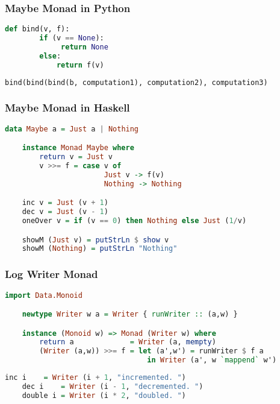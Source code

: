 \documentclass[presentation.tex]{subfiles}
\begin{document}
\begin{frame}[fragile]
  \frametitle{Maybe Monad in Python}
  \begin{lstlisting}[frame=single,language=Python,breaklines=true]
    def bind(v, f):
        if (v == None):
             return None
        else:			
            return f(v)
  \end{lstlisting}

  \begin{lstlisting}[frame=single,language=Python,breaklines=true]
    bind(bind(bind(b, computation1), computation2), computation3)
  \end{lstlisting}
\end{frame}


\begin{frame}[fragile]
  \frametitle{Maybe Monad in Haskell}
  \begin{lstlisting}[frame=single,language=Haskell,breaklines=true]
    data Maybe a = Just a | Nothing

    instance Monad Maybe where
        return v = Just v
        v >>= f = case v of
                       Just v -> f(v)
                       Nothing -> Nothing

    inc v = Just (v + 1)
    dec v = Just (v - 1)
    oneOver v = if (v == 0) then Nothing else Just (1/v)

    showM (Just v) = putStrLn $ show v
    showM (Nothing) = putStrLn "Nothing"
  \end{lstlisting}
\end{frame}

\begin{frame}[fragile]
  \frametitle{Log Writer Monad}
  \begin{lstlisting}[frame=single,language=Haskell,breaklines=true]
    import Data.Monoid

    newtype Writer w a = Writer { runWriter :: (a,w) }

    instance (Monoid w) => Monad (Writer w) where
        return a             = Writer (a, mempty)
        (Writer (a,w)) >>= f = let (a',w') = runWriter $ f a
                                 in Writer (a', w `mappend` w')
  \end{lstlisting}
  \pause
  \begin{lstlisting}[frame=single,language=Haskell,breaklines=true]
    inc i    = Writer (i + 1, "incremented. ")
    dec i    = Writer (i - 1, "decremented. ")
    double i = Writer (i * 2, "doubled. ")
  \end{lstlisting}
\end{frame}
\end{document}
